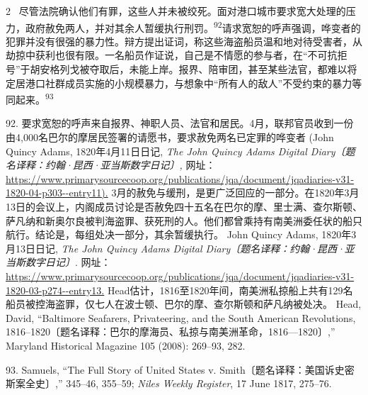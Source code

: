 \documentclass[10pt,a4paper]{article}
\begin{document}
\begin{paracol}{2}
\switchcolumn*
{\scriptsize\color{gray} [p. 21]}\ 尽管法院确认他们有罪，这些人并未被绞死。面对港口城市要求宽大处理的压力，政府赦免两人，并对其余人暂缓执行刑\mbox{罚。\textsuperscript{92}}请求宽恕的呼声强调，哗变者的犯罪并没有很强的暴力性。辩方提出证词，称这些海盗船员温和地对待受害者，从劫掠中获利也很有限。一名船员作证说，自己是不情愿的参与者，在“不可抗拒号”于胡安格列戈被夺取后，未能上岸。报界、陪审团，甚至某些法官，都难以将定居港口社群成员实施的小规模暴力，与想象中“所有人的敌人”不受约束的暴力等同起\mbox{来。\textsuperscript{93}}\par{\small 92. 要求宽恕的呼声来自报界、神职人员、法官和居民。4月，联邦官员收到一份由4,000名巴尔的摩居民签署的请愿书，要求赦免两名已定罪的哗变者 (John Quincy Adams, 1820年4月11日日记, \textit{The John Quincy Adams Digital Diary〔题名译释：约翰·昆西·亚当斯数字日记〕,} 网址： \url{https://www.primarysourcecoop.org/publications/jqa/document/jqadiaries-v31-1820-04-p303--entry11).} 3月的赦免与缓刑，是更广泛回应的一部分。在1820年3月13日的会议上，内阁成员讨论是否赦免四十五名在巴尔的摩、里士满、查尔斯顿、萨凡纳和新奥尔良被判海盗罪、获死刑的人。他们都曾乘持有南美洲委任状的船只航行。结论是，每组处决一部分，其余暂缓执行。 John Quincy Adams, 1820年3月13日日记, \textit{The John Quincy Adams Digital Diary〔题名译释：约翰·昆西·亚当斯数字日记〕}. 网址： \url{https://www.primarysourcecoop.org/publications/jqa/document/jqadiaries-v31-1820-03-p274--entry13.} Head估计，1816至1820年间，南美洲私掠船上共有129名船员被控海盗罪，仅七人在波士顿、巴尔的摩、查尔斯顿和萨凡纳被处决。 Head, David, “Baltimore Seafarers, Privateering, and the South American Revolutions, 1816–1820〔题名译释：巴尔的摩海员、私掠与南美洲革命，1816—1820〕,” Maryland Historical Magazine 105 (2008): 269–93, 282.\par}{\small 93. Samuels, “The Full Story of United States v. Smith〔题名译释：美国诉史密斯案全史〕,” 345–46, 355–59; \textit{Niles Weekly Register}, 17 June 1817, 275–76.\par}
\switchcolumn

\end{paracol}
\end{document}

